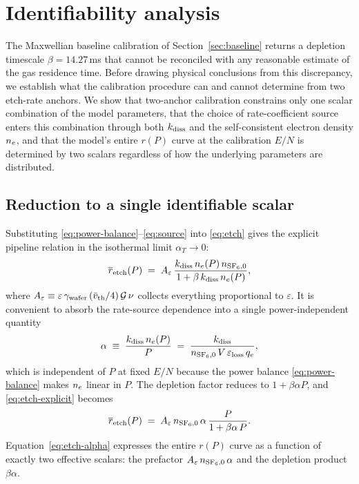 \section{Identifiability analysis}
\label{sec:identifiability}

The Maxwellian baseline calibration of Section~\ref{sec:baseline}
returns a depletion timescale $\beta = 14.27\,$ms that cannot be
reconciled with any reasonable estimate of the gas residence time.
Before drawing physical conclusions from this discrepancy, we
establish what the calibration procedure can and cannot determine
from two etch-rate anchors. We show that two-anchor calibration
constrains only one scalar combination of the model parameters,
that the choice of rate-coefficient source enters this combination
through both $k_{\mathrm{diss}}$ and the self-consistent electron density
$n_e$, and that the model's entire $r(P)$ curve at the calibration
$E/N$ is determined by two scalars regardless of how the underlying
parameters are distributed.

\subsection{Reduction to a single identifiable scalar}
\label{sec:identifiability:reduction}

Substituting \eqref{eq:power-balance}--\eqref{eq:source} into
\eqref{eq:etch} gives the explicit pipeline relation in the
isothermal limit $\alpha_T \to 0$:
\begin{equation}
  \overline{r}_{\mathrm{etch}}(P)
  \;=\;
  A_\varepsilon\,
  \frac{k_{\mathrm{diss}}\,n_e(P)\,n_{\mathrm{SF}_6,0}}
       {1 + \beta\,k_{\mathrm{diss}}\,n_e(P)},
  \label{eq:etch-explicit}
\end{equation}
where
$A_\varepsilon \equiv \varepsilon\,\gamma_{\mathrm{wafer}}\,
(\bar v_{\mathrm{th}}/4)\,\mathcal{G}\,\nu$ collects everything proportional to
$\varepsilon$. It is convenient to absorb the rate-source
dependence into a single power-independent quantity
\begin{equation}
  \alpha
  \;\equiv\;
  \frac{k_{\mathrm{diss}}\,n_e(P)}{P}
  \;=\;
  \frac{k_{\mathrm{diss}}}
       {n_{\mathrm{SF}_6,0}\,V\,\varepsilon_{\mathrm{loss}}\,q_e},
  \label{eq:alpha}
\end{equation}
which is independent of $P$ at fixed $E/N$ because the power balance
\eqref{eq:power-balance} makes $n_e$ linear in $P$. The depletion
factor reduces to $1 + \beta\alpha P$, and
\eqref{eq:etch-explicit} becomes
\begin{equation}
  \overline{r}_{\mathrm{etch}}(P)
  \;=\;
  A_\varepsilon\,n_{\mathrm{SF}_6,0}\,\alpha\,
  \frac{P}{1 + \beta\alpha\,P}.
  \label{eq:etch-alpha}
\end{equation}
Equation~\eqref{eq:etch-alpha} expresses the entire $r(P)$ curve as
a function of exactly two effective scalars: the prefactor
$A_\varepsilon\,n_{\mathrm{SF}_6,0}\,\alpha$ and the depletion product
$\beta\alpha$.

